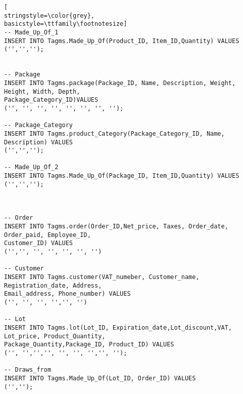 \begin{lstlisting}[
stringstyle=\color{grey},
basicstyle=\ttfamily\footnotesize]
-- Made_Up_Of_1
INSERT INTO Tagms.Made_Up_Of(Product_ID, Item_ID,Quantity) VALUES
('','','');


-- Package
INSERT INTO Tagms.package(Package_ID, Name, Description, Weight, Height, Width, Depth, 
Package_Category_ID)VALUES
('', '', '', '', '', '', '', '');

-- Package_Category
INSERT INTO Tagms.product_Category(Package_Category_ID, Name, Description) VALUES 
('','','');

-- Made_Up_Of_2
INSERT INTO Tagms.Made_Up_Of(Package_ID, Item_ID,Quantity) VALUES
('','','');



-- Order
INSERT INTO Tagms.order(Order_ID,Net_price, Taxes, Order_date, Order_paid, Employee_ID, 
Customer_ID) VALUES 
('','', '', '', '', '', '')

-- Customer
INSERT INTO Tagms.customer(VAT_numeber, Customer_name, Registration_date, Address, 
Email_address, Phone_number) VALUES
('', '', '', '','', '')

-- Lot
INSERT INTO Tagms.lot(Lot_ID, Expiration_date,Lot_discount,VAT, Lot_price, Product_Quantity, 
Package_Quantity,Package_ID, Product_ID) VALUES 
('', '','','', '', '', '','', '');

-- Draws_from
INSERT INTO Tagms.Made_Up_Of(Lot_ID, Order_ID) VALUES 
('','');

\end{lstlisting}
